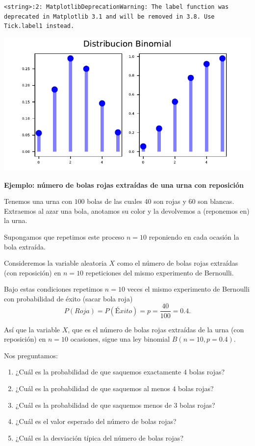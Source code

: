 \documentclass[
  letterpaper,
  DIV=11,
  numbers=noendperiod]{scrreprt}
\providecommand{\tightlist}{%
  \setlength{\itemsep}{0pt}\setlength{\parskip}{0pt}}\usepackage{longtable,booktabs,array}
\begin{document}
\begin{verbatim}
<string>:2: MatplotlibDeprecationWarning: The label function was deprecated in Matplotlib 3.1 and will be removed in 3.8. Use Tick.label1 instead.
\end{verbatim}

\includegraphics{3_files/figure-pdf/dibu_python2-1.pdf}

\textbf{Ejemplo: número de bolas rojas extraídas de una urna con
reposición}

Tenemos una urna con \(100\) bolas de las cuales 40 son rojas y 60 son
blancas. Extraemos al azar una bola, anotamos su color y la devolvemos a
(reponemos en) la urna.

Supongamos que repetimos este proceso \(n=10\) reponiendo en cada
ocasión la bola extraída.

Consideremos la variable aleatoria \(X\) como el número de bolas rojas
extraídas (con reposición) en \(n=10\) repeticiones del mismo
experimento de Bernoulli.

Bajo estas condiciones repetimos \(n=10\) veces el mismo experimento de
Bernoulli con probabilidad de éxito (sacar bola roja)
\[P(Roja)=P(Éxito)=p=\frac{40}{100}=0.4.\]

Así que la variable \(X\), que es el número de bolas rojas extraídas de
la urna (con reposición) en \(n=10\) ocasiones, sigue una ley binomial
\(B(n=10,p=0.4).\)

Nos preguntamos:

\begin{enumerate}
\def\labelenumi{\arabic{enumi}.}
\tightlist
\item
  ¿Cuál es la probabilidad de que saquemos exactamente \(4\) bolas
  rojas?
\item
  ¿Cuál es la probabilidad de que saquemos al menos \(4\) bolas rojas?
\item
  ¿Cuál es la probabilidad de que saquemos menos de \(3\) bolas rojas?
\item
  ¿Cuál es el valor esperado del número de bolas rojas?
\item
  ¿Cuál es la desviación típica del número de bolas rojas?
\end{enumerate}
\end{document}
